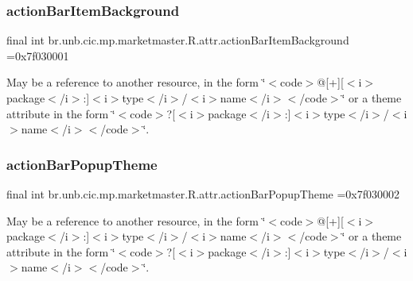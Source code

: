 \subsubsection{\texorpdfstring{action\+Bar\+Item\+Background}{actionBarItemBackground}}
{\footnotesize\ttfamily final int br.\+unb.\+cic.\+mp.\+marketmaster.\+R.\+attr.\+action\+Bar\+Item\+Background =0x7f030001\hspace{0.3cm}{\ttfamily [static]}}

May be a reference to another resource, in the form \char`\"{}$<$code$>$@\mbox{[}+\mbox{]}\mbox{[}$<$i$>$package$<$/i$>$\+:\mbox{]}$<$i$>$type$<$/i$>$/$<$i$>$name$<$/i$>$$<$/code$>$\char`\"{} or a theme attribute in the form \char`\"{}$<$code$>$?\mbox{[}$<$i$>$package$<$/i$>$\+:\mbox{]}$<$i$>$type$<$/i$>$/$<$i$>$name$<$/i$>$$<$/code$>$\char`\"{}. \mbox{\label{classbr_1_1unb_1_1cic_1_1mp_1_1marketmaster_1_1R_1_1attr_a5dc9dcf0e3c3c2dae16c53b127669fc3}} 
\subsubsection{\texorpdfstring{action\+Bar\+Popup\+Theme}{actionBarPopupTheme}}
{\footnotesize\ttfamily final int br.\+unb.\+cic.\+mp.\+marketmaster.\+R.\+attr.\+action\+Bar\+Popup\+Theme =0x7f030002\hspace{0.3cm}{\ttfamily [static]}}

May be a reference to another resource, in the form \char`\"{}$<$code$>$@\mbox{[}+\mbox{]}\mbox{[}$<$i$>$package$<$/i$>$\+:\mbox{]}$<$i$>$type$<$/i$>$/$<$i$>$name$<$/i$>$$<$/code$>$\char`\"{} or a theme attribute in the form \char`\"{}$<$code$>$?\mbox{[}$<$i$>$package$<$/i$>$\+:\mbox{]}$<$i$>$type$<$/i$>$/$<$i$>$name$<$/i$>$$<$/code$>$\char`\"{}. \mbox{\label{classbr_1_1unb_1_1cic_1_1mp_1_1marketmaster_1_1R_1_1attr_a3771bc7111c83a9aff1cb244722ea5bb}} 
